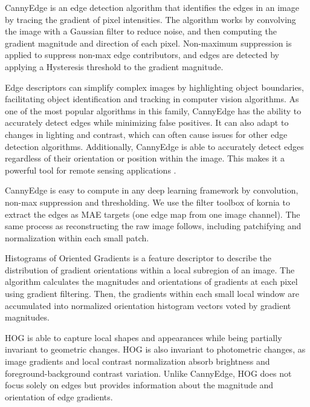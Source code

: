 \documentclass[lettersize,journal]{IEEEtran}
\begin{document}
\vspace{0.5em}
\hspace{0.3em}
CannyEdge \cite{canny1986computational} is an edge detection algorithm that identifies the edges in an image by tracing the gradient of pixel intensities. The algorithm works by convolving the image with a Gaussian filter to reduce noise, and then computing the gradient magnitude and direction of each pixel. Non-maximum suppression is applied to suppress non-max edge contributors, and edges are detected by applying a Hysteresis threshold to the gradient magnitude.

Edge descriptors can simplify complex images by highlighting object boundaries, facilitating object identification and tracking in computer vision algorithms. As one of the most popular algorithms in this family, CannyEdge has the ability to accurately detect edges while minimizing false positives. It can also adapt to changes in lighting and contrast, which can often cause issues for other edge detection algorithms. Additionally, CannyEdge is able to accurately detect edges regardless of their orientation or position within the image. This makes it a powerful tool for remote sensing applications \cite{liu2004automated}.

CannyEdge is easy to compute in any deep learning framework by convolution, non-max suppression and thresholding. We use the filter toolbox of kornia \cite{riba2020kornia} to extract the edges as MAE targets (one edge map from one image channel). The same process as reconstructing the raw image follows, including patchifying and normalization within each small patch.



\vspace{0.5em}
\hspace{0.3em}
Histograms of Oriented Gradients \cite{dalal2005histograms} is a feature descriptor to describe the distribution of gradient orientations within a local subregion of an image. The algorithm calculates the magnitudes and orientations of gradients at each pixel using gradient filtering. Then, the gradients within each small local window are accumulated into normalized orientation histogram vectors voted by gradient magnitudes.

HOG is able to capture local shapes and appearances while being partially invariant to geometric changes. HOG is also invariant to photometric changes, as image gradients and local contrast normalization absorb brightness and foreground-background contrast variation. Unlike CannyEdge, HOG does not focus solely on edges but provides information about the magnitude and orientation of edge gradients.
\end{document}
